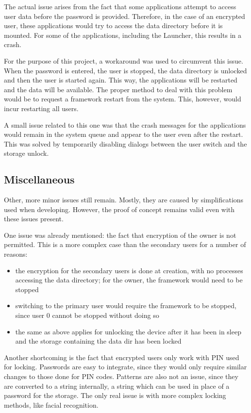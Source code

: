 The actual issue arises from the fact that some applications attempt to access user data before the password is provided. Therefore, in the case of an encrypted user, these applications would try to access the data directory before it is mounted. For some of the applications, including the Launcher, this results in a crash.

For the purpose of this project, a workaround was used to circumvent this issue. When the password is entered, the user is stopped, the data directory is unlocked and then the user is started again. This way, the applications will be restarted and the data will be available. The proper method to deal with this problem would be to request a framework restart from the system. This, however, would incur restarting all users.

A small issue related to this one was that the crash messages for the applications would remain in the system queue and appear to the user even after the restart. This was solved by temporarily disabling dialogs between the user switch and the storage unlock.

\subsection{Miscellaneous}
\label{sub-sec:misc-mult-user}

Other, more minor issues still remain. Mostly, they are caused by simplifications used when developing. However, the proof of concept remains valid even with these issues present.

One issue was already mentioned: the fact that encryption of the owner is not permitted. This is a more complex case than the secondary users for a number of reasons:
\begin{itemize}
\item the encryption for the secondary users is done at creation, with no processes accessing the data directory; for the owner, the framework would need to be stopped
\item switching to the primary user would require the framework to be stopped, since user 0 cannot be stopped without doing so
\item the same as above applies for unlocking the device after it has been in sleep and the storage containing the data dir has been locked
\end{itemize}

Another shortcoming is the fact that encrypted users only work with PIN used for locking. Passwords are easy to integrate, since they would only require similar changes to those done for PIN codes. Patterns are also not an issue, since they are converted to a string internally, a string which can be used in place of a password for the storage. The only real issue is with more complex locking methods, like facial recognition.

